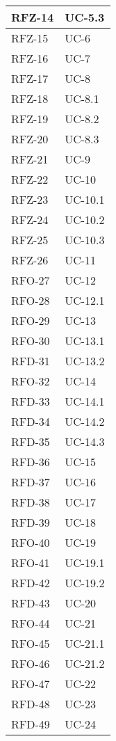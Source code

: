 \begin{xltabular}{\textwidth}{|X | X|}
    \hline
    RFZ-14 & UC-5.3 \\
    \hline
    RFZ-15 & UC-6 \\
    \hline
    RFZ-16 & UC-7 \\
    \hline
    RFZ-17 & UC-8 \\
    \hline
    RFZ-18 & UC-8.1 \\
    \hline
    RFZ-19 & UC-8.2 \\
    \hline
    RFZ-20 & UC-8.3 \\
    \hline
    RFZ-21 & UC-9 \\
    \hline
    RFZ-22 & UC-10 \\
    \hline
    RFZ-23 & UC-10.1 \\
    \hline
    RFZ-24 & UC-10.2 \\
    \hline
    RFZ-25 & UC-10.3 \\
    \hline
    RFZ-26 & UC-11 \\
    \hline
    RFO-27 & UC-12 \\
    \hline
    RFO-28 & UC-12.1 \\
    \hline
    RFO-29 & UC-13 \\
    \hline
    RFO-30 & UC-13.1 \\
    \hline
    RFD-31 & UC-13.2 \\
    \hline
    RFO-32 & UC-14 \\
    \hline
    RFD-33 & UC-14.1 \\
    \hline
    RFD-34 & UC-14.2 \\
    \hline
    RFD-35 & UC-14.3 \\
    \hline
    RFD-36 & UC-15 \\
    \hline
    RFD-37 & UC-16 \\
    \hline
    RFD-38 & UC-17 \\
    \hline
    RFD-39 & UC-18 \\
    \hline
    RFO-40 & UC-19 \\
    \hline
    RFO-41 & UC-19.1 \\
    \hline
    RFD-42 & UC-19.2 \\
    \hline
    RFD-43 & UC-20 \\
    \hline
    RFO-44 & UC-21 \\
    \hline
    RFO-45 & UC-21.1 \\
    \hline
    RFO-46 & UC-21.2\\
    \hline
    RFO-47 & UC-22 \\
    \hline
    RFD-48 & UC-23 \\
    \hline
    RFD-49 & UC-24 \\

\end{xltabular}
